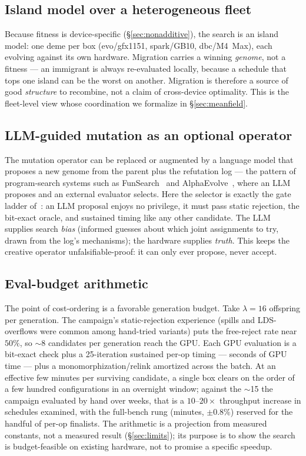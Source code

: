 \documentclass[11pt]{article}
\begin{document}
\subsection{Island model over a heterogeneous fleet}
\label{sec:islands}

Because fitness is device-specific (\S\ref{sec:nonadditive}), the search is an island model: one deme per
box (evo/gfx1151, spark/GB10, dbc/M4~Max), each evolving against its own hardware. Migration carries a
winning \emph{genome}, not a fitness --- an immigrant is always re-evaluated locally, because a schedule that
tops one island can be the worst on another. Migration is therefore a source of good \emph{structure} to
recombine, not a claim of cross-device optimality. This is the fleet-level view whose coordination we
formalize in \S\ref{sec:meanfield}.

\subsection{LLM-guided mutation as an optional operator}
\label{sec:llmop}

The mutation operator can be replaced or augmented by a language model that proposes a new genome from the
parent plus the refutation log --- the pattern of program-search systems such as FunSearch~\cite{funsearch}
and AlphaEvolve~\cite{alphaevolve}, where an LLM proposes and an external evaluator selects. Here the
selector is exactly the gate ladder of~\cite{refutation}: an LLM proposal enjoys no privilege, it must pass
static rejection, the bit-exact oracle, and sustained timing like any other candidate. The LLM supplies
search \emph{bias} (informed guesses about which joint assignments to try, drawn from the log's mechanisms);
the hardware supplies \emph{truth}. This keeps the creative operator unfalsifiable-proof: it can only ever
propose, never accept.

\subsection{Eval-budget arithmetic}
\label{sec:budget}

The point of cost-ordering is a favorable generation budget. Take $\lambda=16$ offspring per generation. The
campaign's static-rejection experience (spills and LDS-overflows were common among hand-tried variants)
puts the free-reject rate near $50\%$, so $\sim$8 candidates per generation reach the GPU. Each GPU
evaluation is a bit-exact check plus a 25-iteration sustained per-op timing --- seconds of GPU time --- plus
a monomorphization/relink amortized across the batch. At an effective few minutes per surviving candidate, a
single box clears on the order of a few hundred configurations in an overnight window; against the
$\sim$15 the campaign evaluated by hand over weeks, that is a $10$--$20\times$ throughput increase in
schedules examined, with the full-bench rung (minutes, $\pm0.8\%$) reserved for the handful of per-op
finalists. The arithmetic is a projection from measured constants, not a measured result
(\S\ref{sec:limits}); its purpose is to show the search is budget-feasible on existing hardware, not to
promise a specific speedup.
\end{document}
